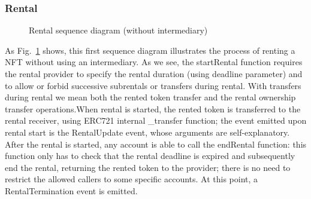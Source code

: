 \documentclass[english, LaM, oneside]{sapthesis}%
\begin{document}
\subsubsection{Rental}

\begin{figure}
    \centering
        \begin{adjustbox}{width=1\textwidth}
        \end{adjustbox}
    \caption{Rental sequence diagram (without intermediary)}
    \label{fig:Rental SD}
\end{figure}

As Fig.~\ref{fig:Rental SD} shows, this first sequence diagram illustrates the process of renting a NFT without using an intermediary. As we see, the startRental function requires the rental provider to specify the rental duration (using deadline parameter) and to allow or forbid successive subrentals or transfers during rental. With transfers during rental we mean both the rented token transfer and the rental ownership transfer operations.\newline When rental is started, the rented token is transferred to the rental receiver, using ERC721 internal \_transfer function; the event emitted upon rental start is the RentalUpdate event, whose arguments are self-explanatory.\newline
After the rental is started, any account is able to call the endRental function: this function only has to check that the rental deadline is expired and subsequently end the rental, returning the rented token to the provider; there is no need to restrict the allowed callers to some specific accounts. At this point, a RentalTermination event is emitted. \bigskip
\end{document}
